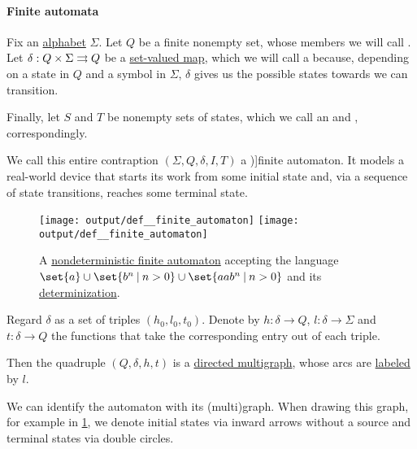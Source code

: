 \paragraph{Finite automata}

\begin{definition}\label{def:finite_automaton}
  Fix an \hyperref[def:formal_language]{alphabet} \( \Sigma \). Let \( Q \) be a finite nonempty set, whose members we will call . Let \( \delta: Q \times \Sigma \rightrightarrows Q \) be a \hyperref[def:set_valued_map]{set-valued map}, which we will call a  because, depending on a state in \( Q \) and a symbol in \( \Sigma \), \( \delta \) gives us the possible states towards we can transition.

  Finally, let \( S \) and \( T \) be nonempty sets of states, which we call an  and , correspondingly.

  We call this entire contraption \( (\Sigma, Q, \delta, I, T) \) a \term[ru=конечный автомат (\cite[159]{Гладкий1973Языки})]{finite automaton}. It models a real-world device that starts its work from some initial state and, via a sequence of state transitions, reaches some terminal state.

  \begin{figure}[!ht]
    \hfill
    \texttt{[image: output/def\_\_finite\_automaton]}
    \hfill
    \texttt{[image: output/def\_\_finite\_automaton]}
    \hfill\hfill
    \caption{A \hyperref[def:finite_automaton/determinism]{nondeterministic finite automaton} accepting the language \( \set{ a } \cup \set{ b^n \given n > 0 } \cup \set{ aa b^n \given n > 0 } \) and its \hyperref[alg:determinization_of_finite_automata]{determinization}.}
    \label{fig:def:finite_automaton}
  \end{figure}

  \begin{thmenum}
    \mimprovised Regard \( \delta \) as a set of triples \( (h_0, l_0, t_0) \). Denote by \( h: \delta \to Q \), \( l: \delta \to \Sigma \) and \( t: \delta \to Q \) the functions that take the corresponding entry out of each triple.

    Then the quadruple \( (Q, \delta, h, t) \) is a \hyperref[def:directed_multigraph]{directed multigraph}, whose arcs are \hyperref[def:labeled_set]{labeled} by \( l \).

    We can identify the automaton with its (multi)graph. When drawing this graph, for example in \cref{fig:def:finite_automaton}, we denote initial states via inward arrows without a source and terminal states via double circles.


\end{thmenum}
\end{definition}

